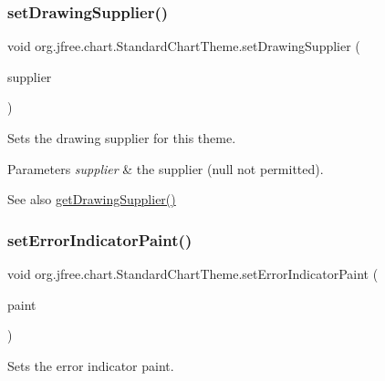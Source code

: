 \subsubsection{\texorpdfstring{set\+Drawing\+Supplier()}{setDrawingSupplier()}}
{\footnotesize\ttfamily void org.\+jfree.\+chart.\+Standard\+Chart\+Theme.\+set\+Drawing\+Supplier (\begin{DoxyParamCaption}\item[{\mbox{\hyperlink{interfaceorg_1_1jfree_1_1chart_1_1plot_1_1_drawing_supplier}{Drawing\+Supplier}}}]{supplier }\end{DoxyParamCaption})}

Sets the drawing supplier for this theme.


\begin{DoxyParams}{Parameters}
{\em supplier} & the supplier ({\ttfamily null} not permitted).\\
\hline
\end{DoxyParams}
\begin{DoxySeeAlso}{See also}
\mbox{\hyperlink{classorg_1_1jfree_1_1chart_1_1_standard_chart_theme_ae65c77546155e63cdbd2f84a003c1321}{get\+Drawing\+Supplier()}} 
\end{DoxySeeAlso}
\mbox{\label{classorg_1_1jfree_1_1chart_1_1_standard_chart_theme_ad96237806fc1b9d3c709a0c972ae0519}} 
\subsubsection{\texorpdfstring{set\+Error\+Indicator\+Paint()}{setErrorIndicatorPaint()}}
{\footnotesize\ttfamily void org.\+jfree.\+chart.\+Standard\+Chart\+Theme.\+set\+Error\+Indicator\+Paint (\begin{DoxyParamCaption}\item[{Paint}]{paint }\end{DoxyParamCaption})}

Sets the error indicator paint.


